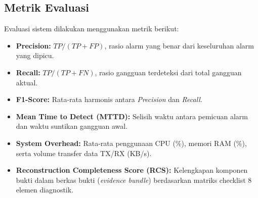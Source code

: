 \subsection{Metrik Evaluasi}
Evaluasi sistem dilakukan menggunakan metrik berikut:
\begin{itemize}
    \item \textbf{Precision:} $TP / (TP + FP)$, rasio alarm yang benar dari keseluruhan alarm yang dipicu.
    \item \textbf{Recall:} $TP / (TP + FN)$, rasio gangguan terdeteksi dari total gangguan aktual.
    \item \textbf{F1-Score:} Rata-rata harmonis antara \textit{Precision} dan \textit{Recall}.
    \item \textbf{Mean Time to Detect (MTTD):} Selisih waktu antara pemicuan alarm dan waktu suntikan gangguan awal.
    \item \textbf{System Overhead:} Rata-rata penggunaan CPU (\%), memori RAM (\%), serta volume transfer data TX/RX (KB/s).
    \item \textbf{Reconstruction Completeness Score (RCS):} Kelengkapan komponen bukti dalam berkas bukti (\textit{evidence bundle}) berdasarkan matriks checklist 8 elemen diagnostik.
\end{itemize}